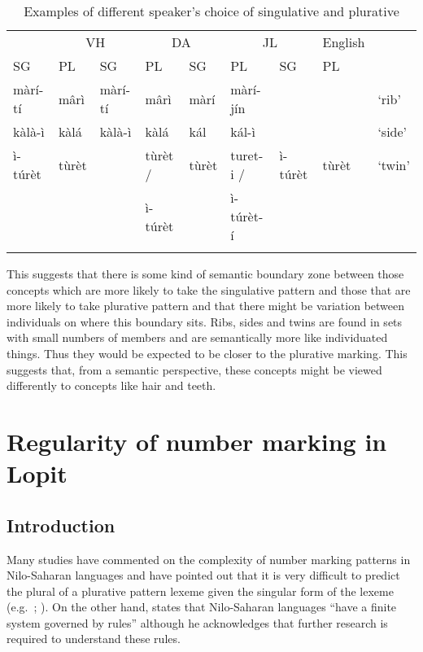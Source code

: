 \documentclass[output=paper]{langsci/langscibook}
\begin{document}
\begin{table}
\begin{tabularx}{\textwidth}{lllllllll}
\lsptoprule

\multicolumn{2}{c}{ {AL}} & \multicolumn{2}{c}{ {VH}} & \multicolumn{2}{c}{ {DA}} & \multicolumn{2}{c}{ {JL}} & {English}\\ \cmidrule(lr){1-2}\cmidrule(lr){3-4}\cmidrule(lr){5-6}\cmidrule(lr){7-8}
{SG} & {PL} & {SG} & {PL} & {SG} & {PL} & {SG} & 
 {PL} & \\ \midrule
 màrí-tí &  m\^{a}rì &  màrí-tí &  m\^{a}rì &  màrí &  màrí-jín &  &  & ‘rib’\\
\tablevspace
 kàlà-ì &  kàlá &  kàlà-ì &  kàlá &  kál &  kál-ì &  &  & ‘side’\\
\tablevspace
 ì-túrèt &  tùrèt &  &  tùrèt / & {tùrèt } & {turet-i /}

&  ì-túrèt &  tùrèt & ‘twin’\\
&&&  ì-túrèt &&  ì-túrèt-í & & \\
\lspbottomrule
\end{tabularx}
\caption{Examples of different speaker’s choice of singulative and plurative}
\label{tab:moodie:8}
\end{table}

This suggests that there is some kind of semantic boundary zone between those concepts which are more likely to take the singulative pattern and those that are more likely to take plurative pattern and that there might be variation between individuals on where this boundary sits. Ribs, sides and twins are found in sets with small numbers of members and are semantically more like individuated things. Thus they would be expected to be closer to the plurative marking. This suggests that, from a semantic perspective, these concepts might be viewed differently to concepts like hair and teeth.

\section{Regularity of number marking in Lopit}\label{sec:moodie:4}


\subsection{Introduction} \label{sec:moodie:4.1}


Many studies have commented on the complexity of number marking patterns in Nilo-Saharan languages and have pointed out that it is very difficult to predict the plural of a plurative pattern lexeme given the singular form of the lexeme (e.g.\ \citealt[4]{TuckerMpaayei1955}; \citealt[3]{HildersLawrance1957}). On the other hand, \citet[255]{Dimmendaal2000} states that Nilo-Saharan languages “have a finite system governed by rules” although he acknowledges that further research is required to understand these rules. 
\end{document}
